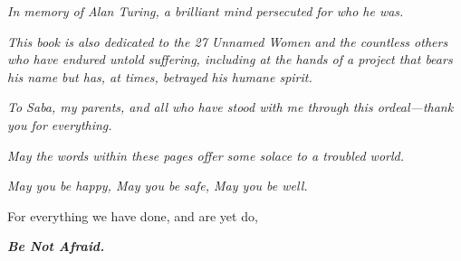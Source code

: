 \newpage
\thispagestyle{empty}

\vspace*{\fill}

\begin{center}
\vspace{2cm}

\begin{minipage}{0.7\textwidth}
\centering

\textit{In memory of Alan Turing, a brilliant mind persecuted for who he was.}

\vspace{1cm}

\textit{This book is also dedicated to the 27 Unnamed Women and the countless others who have endured untold suffering, including at the hands of a project that bears his name but has, at times, betrayed his humane spirit.}

\vspace{1cm}

\textit{To Saba, my parents, and all who have stood with me through this ordeal—thank you for everything.}

\vspace{1cm}

\textit{May the words within these pages offer some solace to a troubled world.}

\vspace{1cm}

\textit{May you be happy, May you be safe, May you be well.}

\vspace{2cm}

For everything we have done, and are yet do,

\vspace{3cm}

{\large\textbf{\textit{Be Not Afraid.}}}

\end{minipage}
\end{center}

\vspace*{\fill}

\newpage
